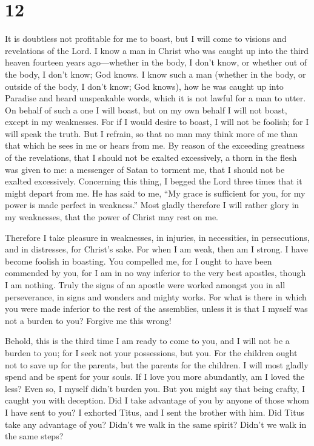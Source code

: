 \hypertarget{section-11}{%
\section{12}\label{section-11}}

 It is doubtless not profitable for me to boast, but I
will come to visions and revelations of the Lord.  I know
a man in Christ who was caught up into the third heaven fourteen years
ago---whether in the body, I don't know, or whether out of the body, I
don't know; God knows.  I know such a man (whether in the
body, or outside of the body, I don't know; God knows), 
how he was caught up into Paradise and heard unspeakable words, which it
is not lawful for a man to utter.  On behalf of such a one
I will boast, but on my own behalf I will not boast, except in my
weaknesses.  For if I would desire to boast, I will not be
foolish; for I will speak the truth. But I refrain, so that no man may
think more of me than that which he sees in me or hears from me.
 By reason of the exceeding greatness of the revelations,
that I should not be exalted excessively, a thorn in the flesh was given
to me: a messenger of Satan to torment me, that I should not be exalted
excessively.  Concerning this thing, I begged the Lord
three times that it might depart from me.  He has said to
me, ``My grace is sufficient for you, for my power is made perfect in
weakness.'' Most gladly therefore I will rather glory in my weaknesses,
that the power of Christ may rest on me.

 Therefore I take pleasure in weaknesses, in injuries, in
necessities, in persecutions, and in distresses, for Christ's sake. For
when I am weak, then am I strong.  I have become foolish
in boasting. You compelled me, for I ought to have been commended by
you, for I am in no way inferior to the very best apostles, though I am
nothing.  Truly the signs of an apostle were worked
amongst you in all perseverance, in signs and wonders and mighty works.
 For what is there in which you were made inferior to the
rest of the assemblies, unless it is that I myself was not a burden to
you? Forgive me this wrong!

 Behold, this is the third time I am ready to come to
you, and I will not be a burden to you; for I seek not your possessions,
but you. For the children ought not to save up for the parents, but the
parents for the children.  I will most gladly spend and
be spent for your souls. If I love you more abundantly, am I loved the
less?  Even so, I myself didn't burden you. But you might
say that being crafty, I caught you with deception.  Did
I take advantage of you by anyone of those whom I have sent to you?
 I exhorted Titus, and I sent the brother with him. Did
Titus take any advantage of you? Didn't we walk in the same spirit?
Didn't we walk in the same steps?

